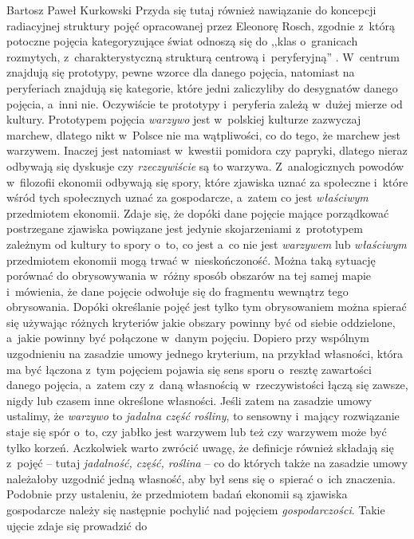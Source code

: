 \begin{artplenv}{Bartosz Paweł Kurkowski}
Przyda się tutaj również nawiązanie do koncepcji radiacyjnej struktury pojęć opracowanej przez Eleonorę Rosch,
zgodnie z~którą potoczne pojęcia kategoryzujące świat odnoszą się do ,,klas o~granicach
rozmytych, z~charakterystyczną strukturą
centrową i~peryferyjną''
\parencite[s.~110]{grzegorczykowa_o_1998}.
W~centrum znajdują się prototypy,
pewne wzorce dla danego pojęcia, natomiast na peryferiach znajdują się kategorie, które jedni zaliczyliby do desygnatów
danego pojęcia, a~inni nie. Oczywiście te prototypy i~peryferia zależą w~dużej mierze od kultury. Prototypem pojęcia
\textit{warzywo} jest w~polskiej kulturze zazwyczaj marchew, dlatego nikt w~Polsce nie ma wątpliwości, co do tego, że
marchew jest warzywem. Inaczej jest natomiast w~kwestii pomidora czy papryki, dlatego nieraz odbywają się dyskusje czy
\textit{rzeczywiście} są to warzywa. Z~analogicznych powodów w~filozofii ekonomii odbywają się spory, które zjawiska
uznać za społeczne i~które wśród tych społecznych uznać za gospodarcze, a~zatem co jest \textit{właściwym} przedmiotem
ekonomii. Zdaje się, że dopóki dane pojęcie mające porządkować postrzegane zjawiska powiązane jest jedynie
skojarzeniami z~prototypem zależnym od kultury to spory o~to, co jest a~co nie jest \textit{warzywem} lub
\textit{właściwym }przedmiotem ekonomii mogą trwać w~nieskończoność. Można taką sytuację porównać do
obrysowywania w~różny sposób obszarów na tej samej mapie i~mówienia, że dane pojęcie odwołuje się do fragmentu wewnątrz tego
obrysowania. Dopóki określanie pojęć jest tylko tym obrysowaniem można spierać się używając różnych kryteriów jakie
obszary powinny być od siebie oddzielone, a~jakie powinny być połączone w~danym pojęciu. Dopiero przy wspólnym
uzgodnieniu na zasadzie umowy jednego kryterium, na przykład własności, która ma być łączona z~tym pojęciem pojawia się
sens sporu o~resztę zawartości danego pojęcia, a~zatem czy z~daną własnością w~rzeczywistości łączą się zawsze, nigdy
lub czasem inne określone własności. Jeśli zatem na zasadzie umowy ustalimy, że \textit{warzywo} to \textit{jadalna
część rośliny}, to sensowny i~mający rozwiązanie staje się spór o~to, czy jabłko jest warzywem lub też czy warzywem
może być tylko korzeń. Aczkolwiek warto zwrócić uwagę, że definicje również składają się z~pojęć -- tutaj
\textit{jadalność, część, roślina} -- co do których także na zasadzie umowy należałoby uzgodnić jedną własność, aby był
sens się o~spierać o~ich znaczenia. Podobnie przy ustaleniu, że przedmiotem badań ekonomii są zjawiska gospodarcze
należy się następnie pochylić nad pojęciem \textit{gospodarczości}. Takie ujęcie zdaje się prowadzić do

\end{artplenv}
